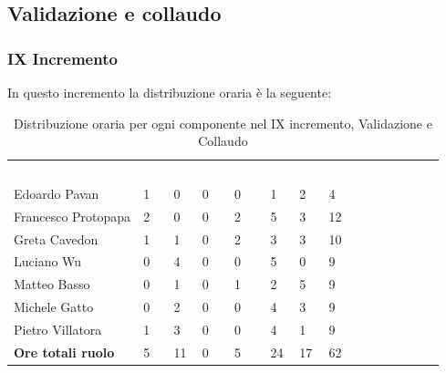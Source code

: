 \subsection{Validazione e collaudo}

\subsubsection{IX Incremento}
In questo incremento la distribuzione oraria è la seguente:
\begin{table}[H]
\begin{center}
\renewcommand{\arraystretch}{1.25}
\begin{tabular}{ m{}<{\centering}  m{}<{\centering} m{}<{\centering} m{}<{\centering}  m{}<{\centering}  m{}<{\centering}  m{}<{\centering}  m{}<{\centering}   }
	\rowcolor{darkblue}
	\textcolor{white}{\textbf{Componente}} &\textcolor{white}{\textbf{Re}}&\textcolor{white}{\textbf{Pt}}&\textcolor{white}{\textbf{An}}&\textcolor{white}{\textbf{Am}}&\textcolor{white}{\textbf{Pr}}&\textcolor{white}{\textbf{Ve}}&\textcolor{white}{\textbf{Ore complessive}}\\ 
	Edoardo Pavan & 1 & 0 & 0 & 0 & 1 & 2 & 4 \\	
	
	Francesco Protopapa & 2 & 0 & 0 & 2 & 5 & 3 & 12 \\

	Greta Cavedon & 1 & 1 & 0 & 2 & 3 & 3 & 10 \\
	
	Luciano Wu & 0 & 4 & 0 & 0 & 5 & 0 & 9 \\
	
	Matteo Basso & 0 & 1 & 0 & 1 & 2 & 5 & 9 \\
	
	Michele Gatto & 0 & 2 & 0 & 0 & 4 & 3 & 9 \\
	
	Pietro Villatora & 1 & 3 & 0 & 0 & 4 & 1 & 9 \\
	
	\textbf{Ore totali ruolo} & 5 & 11 & 0 & 5 & 24 & 17 & 62 \\

\end{tabular}
\caption{Distribuzione oraria per ogni componente nel IX incremento, Validazione e Collaudo}
\end{center}
\end{table}

